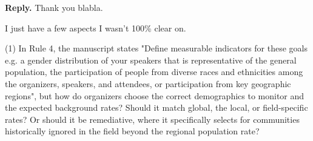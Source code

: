 \documentclass{article}
\newenvironment{Reply}{\noindent\color{BlueViolet}\textbf{Reply.}}{\vspace{1em}}
\begin{document}
\begin{Reply}
    Thank you blabla.
\end{Reply}

I just have a few aspects I wasn't 100\% clear on.


(1) In Rule 4, the manuscript states "Define measurable indicators for these goals e.g. a gender distribution of your speakers that is representative of the general population, the participation of people from diverse races and ethnicities among the organizers, speakers, and attendees, or participation from key geographic regions", but how do organizers choose the correct demographics to monitor and the expected background rates? Should it match global, the local, or field-specific rates? Or should it be remediative, where it specifically selects for communities historically ignored in the field beyond the regional population rate?
\end{document}

